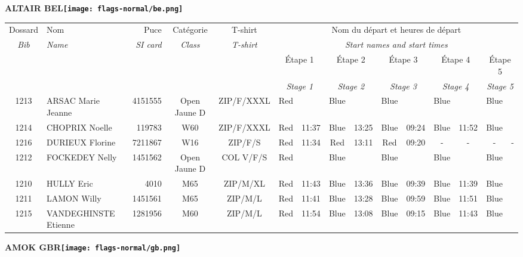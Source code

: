 \documentclass{report}
\begin{document}
\newpage
  \Huge \centering \bfseries ALTAIR  BEL\normalfont \footnotesize \sffamily \hfill \texttt{[image: flags-normal/be.png]} \newline 
  \begin{longtable}{|c|l|r|c|c|*{5}{cc|}}
    Dossard & Nom  & Puce    & Catégorie & T-shirt & \multicolumn{10}{c|}{Nom du départ et heures de départ} \\
    \itshape Bib     & \itshape Name & \itshape SI card & \itshape Class  & \itshape  T-shirt  & \multicolumn{10}{c|}{\itshape Start names and start times} \\
    \hline
    & & & & & \multicolumn{2}{c|}{Étape 1} & \multicolumn{2}{c|}{Étape 2} & \multicolumn{2}{c|}{Étape 3} & \multicolumn{2}{c|}{Étape 4} & \multicolumn{2}{c|}{Étape 5} \\
    & & & & & \multicolumn{2}{c|}{\itshape Stage 1} & \multicolumn{2}{c|}{\itshape Stage 2} & \multicolumn{2}{c|}{\itshape Stage 3} & \multicolumn{2}{c|}{\itshape Stage 4} & \multicolumn{2}{c|}{\itshape Stage 5} \\
    \hline
    1213 & ARSAC Marie Jeanne & 4151555 & Open Jaune D & ZIP/F/XXXL & Red &   & Blue &   & Blue &   & Blue &   & Blue &  \\
    1214 & CHOPRIX Noelle & 119783 & W60 & ZIP/F/XXXL & Red & 11:37 & Blue & 13:25 & Blue & 09:24 & Blue & 11:52 & Blue &  \\
    1216 & DURIEUX Florine & 7211867 & W16 & ZIP/F/S & Red & 11:34 & Red & 13:11 & Red & 09:20 & - &  - & - &  -\\
    1212 & FOCKEDEY Nelly & 1451562 & Open Jaune D & COL V/F/S & Red &   & Blue &   & Blue &   & Blue &   & Blue &  \\
    1210 & HULLY Eric & 4010 & M65 & ZIP/M/XL & Red & 11:43 & Blue & 13:36 & Blue & 09:39 & Blue & 11:39 & Blue &  \\
    1211 & LAMON Willy & 1451561 & M65 & ZIP/M/L & Red & 11:41 & Blue & 13:28 & Blue & 09:59 & Blue & 11:51 & Blue &  \\
    1215 & VANDEGHINSTE Etienne & 1281956 & M60 & ZIP/M/L & Red & 11:54 & Blue & 13:08 & Blue & 09:15 & Blue & 11:43 & Blue &  \\
  \end{longtable}
\newpage
  \Huge \centering \bfseries AMOK  GBR\normalfont \footnotesize \sffamily \hfill \texttt{[image: flags-normal/gb.png]} \newline 
\end{document}
